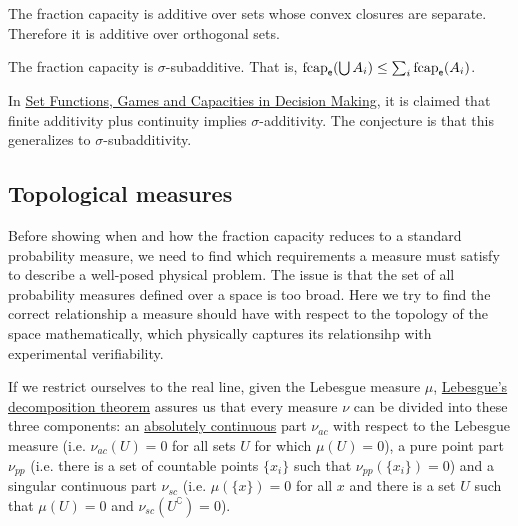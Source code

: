 \begin{conj}
	The fraction capacity is additive over sets whose convex closures are separate. Therefore it is additive over orthogonal sets.
\end{conj}

\begin{conj}
	The fraction capacity is $\sigma$-subadditive. That is, $\mathrm{fcap}_{\mathsf{e}}(\bigcup A_i) \leq \sum_i \mathrm{fcap}_{\mathsf{e}}(A_i)$.
\end{conj}

\begin{remark}
	In \href{https://link.springer.com/book/10.1007/978-3-319-30690-2}{Set Functions, Games and Capacities in Decision Making}, it is claimed that finite additivity plus continuity implies $\sigma$-additivity. The conjecture is that this generalizes to $\sigma$-subadditivity.
\end{remark}

\subsection{Topological measures}
Before showing when and how the fraction capacity reduces to a standard probability measure, we need to find which requirements a measure must satisfy to describe a well-posed physical problem. The issue is that the set of all probability measures defined over a space is too broad. Here we try to find the correct relationship a measure should have with respect to the topology of the space mathematically, which physically captures its relationsihp with experimental verifiability.

If we restrict ourselves to the real line, given the Lebesgue measure $\mu$, \href{https://en.wikipedia.org/wiki/Lebesgue%27s_decomposition_theorem}{Lebesgue's decomposition theorem} assures us that every measure $\nu$ can be divided into these three components: an \href{https://en.wikipedia.org/wiki/Absolute_continuity#Absolute_continuity_of_measures}{absolutely continuous} part $\nu_{ac}$ with respect to the Lebesgue measure (i.e. $\nu_{ac}(U)=0$ for all sets $U$ for which $\mu(U)=0$), a pure point part $\nu_{pp}$ (i.e. there is a set of countable points $\{x_i\}$ such that $\nu_{pp}(\{x_i\})=0$) and a singular continuous part $\nu_{sc}$ (i.e. $\mu(\{x\})=0$ for all $x$ and there is a set $U$ such that $\mu(U)=0$ and $\nu_{sc}(U^{\complement})=0$).


